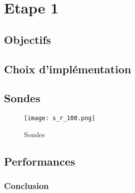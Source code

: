 \section{Etape 1}
\subsection{Objectifs}

\subsection{Choix d'implémentation}

\subsection{Sondes}
\begin{figure}[h]
    \centering
    \texttt{[image: s\_r\_100.png]}
    \caption{Sondes}
\end{figure}
\subsection{Performances}

\subsubsection{Conclusion}
    
    

